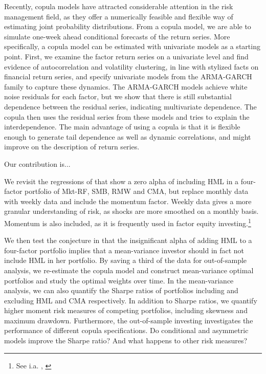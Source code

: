 Recently, copula models have attracted considerable attention in the risk management field, as they offer a numerically feasible and flexible way of estimating joint probability distributions. From a copula model, we are able to simulate one-week ahead conditional forecasts of the return series. More specifically, a copula model can be estimated with univariate models as a starting point. First, we examine the factor return series on a univariate level and find evidence of autocorrelation and volatility clustering, in line with stylized facts on financial return series, and specify univariate models from the ARMA-GARCH family to capture these dynamics. The ARMA-GARCH models achieve white noise residuals for each factor, but we show that there is still substantial dependence between the residual series, indicating multivariate dependence. The copula then uses the residual series from these models and tries to explain the interdependence. The main advantage of using a copula is that it is flexible enough to generate tail dependence as well as dynamic correlations, and might improve on the description of return series.

Our contribution is...

We revisit the regressions of \textcite{FF2015} that show a zero alpha of including HML in a four-factor portfolio of Mkt-RF, SMB, RMW and CMA, but replace monthly data with weekly data and include the momentum factor. Weekly data gives a more granular understanding of risk, as shocks are more smoothed on a monthly basis. Momentum is also included, as it is frequently used in factor equity investing.\footnote{See i.a. \textcite{Pedersen2015}, \textcite{Ilmanen2011}} 

We then test the conjecture in \textcite{FF2015} that the insignificant alpha of adding HML to a four-factor portfolio implies that a mean-variance investor should in fact not include HML in her portfolio. By saving a third of the data for out-of-sample analysis, we re-estimate the copula model and construct mean-variance optimal portfolios and study the optimal weights over time. In the mean-variance analysis, we can also quantify the Sharpe ratios of portfolios including and excluding HML and CMA respectively. In addition to Sharpe ratios, we quantify higher moment risk measures of competing portfolios, including skewness and maximum drawdown. Furthermore, the out-of-sample investing investigates the performance of different copula specifications. Do conditional and asymmetric models improve the Sharpe ratio? And what happens to other risk measures?

